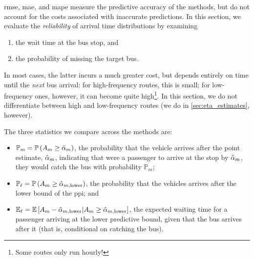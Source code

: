 \Gls{rmse}, \gls{mae}, and \gls{mape} measure the predictive accuracy of the methods, but do not account for the costs associated with inaccurate predictions. In this section, we evaluate the \emph{reliability} of arrival time distributions by examining
\begin{enumerate}
\item the wait time at the bus stop, and
\item the probability of missing the target bus.
\end{enumerate}
In most cases, the latter incurs a much greater cost, but depends entirely on time until the \emph{next} bus arrival: for high-frequency routes, this is small; for low-frequency ones, however, it can become quite high\footnote{Some routes only run hourly!}. In this section, we do not differentiate between high and low-frequency routes (we do in \cref{sec:eta_estimates}, however).


The three statistics we compare across the methods are:
\begin{itemize}
\item $\mathbb{P}_m = \mathbb{P}\left(A_m \geq \hat{\alpha}_m\right)$, the probability that the vehicle arrives after the point estimate, $\hat{\alpha}_m$, indicating that were a passenger to arrive at the stop by $\hat{\alpha}_m$, they would catch the bus with probability $\mathbb{P}_m$;
\item $\mathbb{P}_\ell = \mathbb{P}\left(A_m \geq \hat\alpha_{m,\text{lower}}\right)$, the probability that the vehicles arrives after the lower bound of the \gls{ppi}; and
\item $\mathbb{E}_\ell = \mathbb{E}\left[A_m - \hat\alpha_{m,\text{lower}} | A_m \geq \hat\alpha_{m,\text{lower}}\right]$, the expected waiting time for a passenger arriving at the lower predictive bound, given that the bus arrives after it (that is, conditional on catching the bus).
\end{itemize}


